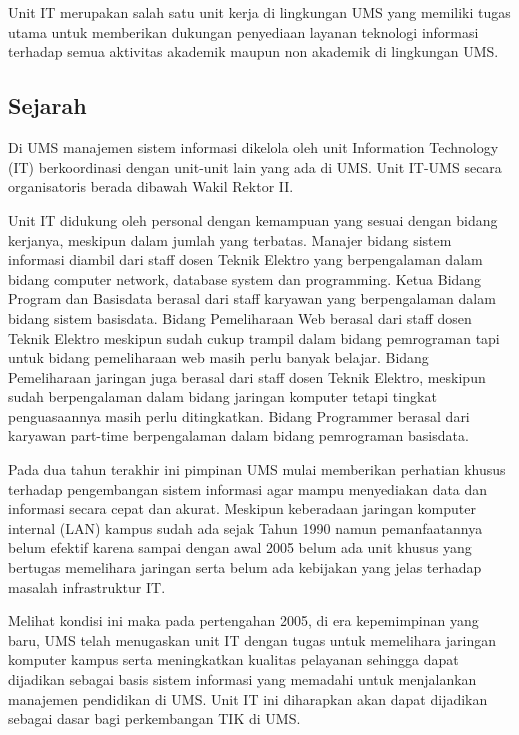\chapter{\babDua}
Unit IT merupakan salah satu unit kerja di lingkungan UMS yang memiliki tugas utama untuk memberikan dukungan penyediaan layanan teknologi informasi terhadap semua aktivitas akademik maupun non akademik di lingkungan UMS.
\section{Sejarah}

Di UMS manajemen sistem informasi dikelola oleh unit Information Technology (IT) berkoordinasi dengan unit-unit lain yang ada di UMS. Unit IT-UMS secara organisatoris berada dibawah Wakil Rektor II.

Unit IT didukung oleh personal dengan kemampuan yang sesuai dengan bidang kerjanya, meskipun dalam jumlah yang terbatas. Manajer bidang sistem informasi diambil dari staff dosen Teknik Elektro yang berpengalaman dalam bidang computer network, database system dan programming. Ketua Bidang Program dan Basisdata berasal dari staff karyawan yang berpengalaman dalam bidang sistem basisdata. Bidang Pemeliharaan Web berasal dari staff dosen Teknik Elektro meskipun sudah cukup trampil dalam bidang pemrograman tapi untuk bidang pemeliharaan web masih perlu banyak belajar. Bidang Pemeliharaan jaringan juga berasal dari staff dosen Teknik Elektro, meskipun sudah berpengalaman dalam bidang jaringan komputer tetapi tingkat penguasaannya masih perlu ditingkatkan. Bidang Programmer berasal dari karyawan part-time berpengalaman dalam bidang pemrograman basisdata.

Pada dua tahun terakhir ini pimpinan UMS mulai memberikan perhatian khusus terhadap pengembangan sistem informasi agar mampu menyediakan data dan informasi secara cepat dan akurat. Meskipun keberadaan jaringan komputer internal (LAN) kampus sudah ada sejak Tahun 1990 namun pemanfaatannya belum efektif karena sampai dengan awal 2005 belum ada unit khusus yang bertugas memelihara jaringan serta belum ada kebijakan yang jelas terhadap masalah infrastruktur IT.

Melihat kondisi ini maka pada pertengahan 2005, di era kepemimpinan yang baru, UMS telah menugaskan unit IT dengan tugas untuk memelihara jaringan komputer kampus serta meningkatkan kualitas pelayanan sehingga dapat dijadikan sebagai basis sistem informasi yang memadahi untuk menjalankan manajemen pendidikan di UMS.  Unit IT ini diharapkan akan dapat dijadikan sebagai dasar bagi perkembangan TIK di UMS.

